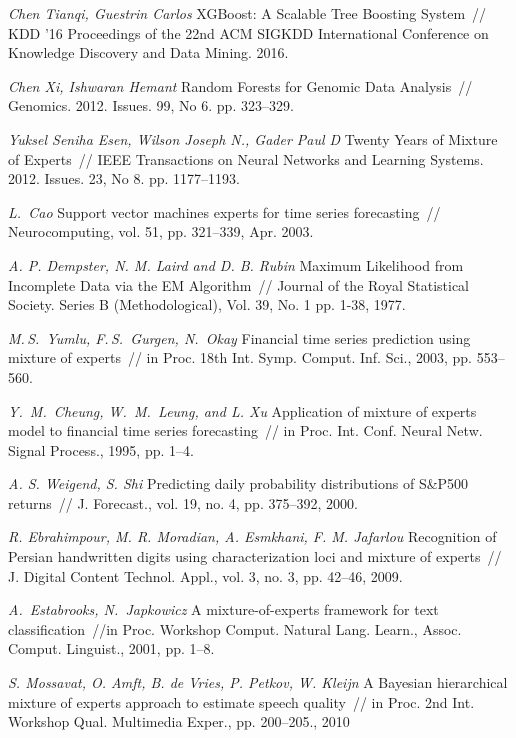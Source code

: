 \documentclass[12pt, twoside]{article}
\numberwithin{equation}{section}
\begin{document}
\begin{thebibliography}{99}
	\textit{Chen Tianqi, Guestrin Carlos} XGBoost: A Scalable Tree Boosting System~// KDD ’16 Proceedings of the 22nd ACM SIGKDD International Conference on Knowledge Discovery and Data Mining. 2016.
	
	\textit{Chen Xi, Ishwaran Hemant} Random Forests for Genomic Data Analysis~// Genomics. 2012. Issues. 99, No 6. pp. 323--329.

	\textit{Yuksel Seniha Esen, Wilson Joseph N., Gader Paul D} Twenty Years of Mixture of Experts~// IEEE Transactions on Neural Networks and Learning Systems. 2012. Issues. 23, No 8. pp. 1177--1193.


	\textit{L.~Cao} Support vector machines experts for time series forecasting~// Neurocomputing, vol. 51, pp. 321–339, Apr. 2003.

	\textit{A. P. Dempster, N. M. Laird and D. B. Rubin} Maximum Likelihood from Incomplete Data via the EM Algorithm~// Journal of the Royal Statistical Society. Series B (Methodological), Vol. 39, No. 1 pp. 1-38, 1977.
	
	
	\textit{M.\,S.~Yumlu, F.\,S.~Gurgen,  N.~Okay} Financial time series prediction using mixture of experts~// in Proc. 18th Int. Symp. Comput. Inf. Sci., 2003, pp. 553--560.
	
	\textit{Y.~M.~Cheung, W.~M.~Leung, and L. Xu} Application of mixture of experts model to financial time series forecasting~// in Proc. Int. Conf. Neural Netw. Signal Process., 1995, pp. 1--4.
	
	\textit{A. S. Weigend, S. Shi} Predicting daily probability distributions of S\&P500 returns~// J. Forecast., vol. 19, no. 4, pp. 375--392, 2000.
	
	\textit{R. Ebrahimpour, M. R. Moradian, A. Esmkhani, F. M. Jafarlou} Recognition of Persian handwritten digits using characterization loci and mixture of experts~// J. Digital Content Technol. Appl., vol. 3, no. 3, pp. 42–46, 2009.
	
	\textit{A.~Estabrooks, N.~Japkowicz} A mixture-of-experts framework for text classification~//in Proc. Workshop Comput. Natural Lang. Learn., Assoc. Comput. Linguist., 2001, pp. 1--8.
	
	\textit{S. Mossavat, O. Amft, B. de Vries, P. Petkov, W. Kleijn} A Bayesian hierarchical mixture of experts approach to estimate speech quality~// in Proc. 2nd Int. Workshop Qual. Multimedia Exper., pp. 200--205., 2010
	

\end{thebibliography}
\end{document}
